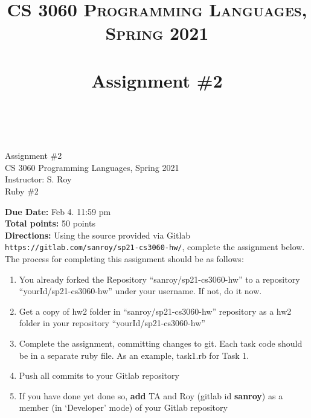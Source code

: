 \documentclass[paper=letter, fontsize=11pt]{scrartcl} %
\title{ 
    \normalfont \normalsize 
    \textsc{CS 3060 Programming Languages, Spring 2021} \\ [25pt] %
    \horrule{0.5pt} \\[0.4cm] %
    \huge Assignment \#2  \\ %
    \horrule{2pt} \\[0.5cm] %
}
\begin{document}
    \begin{center}
         Assignment \#2\\
        \small CS 3060 Programming Languages, Spring 2021 \\
        \small Instructor: S. Roy \\
        \huge Ruby \#2
    \end{center}
    
    \textbf{Due Date:}  Feb 4. 11:59 pm\\

    \textbf{Total points:} 50 points \\

    \textbf{Directions:} Using the source provided via Gitlab \@ \texttt{https://gitlab.com/sanroy/sp21-cs3060-hw/}, 
complete the assignment below. The process for completing this assignment should be as follows:

    \begin{enumerate}[noitemsep]
        \item You already forked the Repository ``sanroy/sp21-cs3060-hw'' to a repository ``yourId/sp21-cs3060-hw'' under your username. If not, do it now.
        \item Get a copy of hw2 folder in ``sanroy/sp21-cs3060-hw'' repository as a hw2 folder in your repository ``yourId/sp21-cs3060-hw'' 
        \item Complete the assignment, committing changes to git. Each task code should be in a separate ruby file. As an example, task1.rb for Task 1. 
        \item Push all commits to your Gitlab repository
        \item If you have done yet done so, \textbf{add} TA and Roy (gitlab id \textbf{sanroy}) as a member (in `Developer' mode) of your Gitlab repository
    \end{enumerate}
\end{document}
